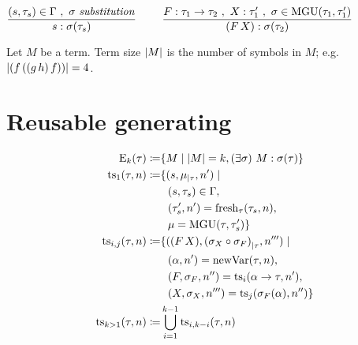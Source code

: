 \documentclass[a4paper,oneside]{memoir}
\begin{document}
~

$\dfrac{(s,\tau_s) \in \Gamma\ ,\ \sigma\ \mathit{substitution}}{s : \sigma(\tau_s)}$
~~~
$\dfrac{F : \tau_1 \rightarrow \tau_2\ ,\ X : \tau^\prime_1\ , \ \sigma \in \operatorname{MGU}(\tau_1,\tau^\prime_1)}{(F\,X) : \sigma(\tau_2)}$


\begin{definition}
Let $M$ be a term. Term size $\lvert M \rvert$ is the number of symbols in $M$; e.g. $\lvert (f\,((g\,h)\,f)) \rvert = 4$. 
\end{definition}

\newcommand{\inhab}[1]{\op{I}(#1)}

\newcommand{\tord}{\preccurlyeq}
\newcommand{\stord}{\prec}
\newcommand{\ordt}{\tord_\tau}
\newcommand{\tek}{\sim}
\newcommand{\ntek}{\nsim}
\newcommand{\ekt}{\tek_\tau}
\newcommand{\nekt}{\ntek_\tau}
\newcommand{\nsucct}{\nsucc_\tau}

\newcommand{\MGI}[1]{\op{MGI}(#1)}
\newcommand{\MGIt}{\MGI{\tau}}
\newcommand{\It}{\op{I}(\tau)}

\newcommand{\ids}{\sigma_{\op{id}}}

\newcommand{\U}[2]{\op{U}(#1,#2)}
\newcommand{\Utt}{\U{\tau}{\tauPr}}
\newcommand{\MGUtt}{\MGU{\tau}{\tauPr}}

\newcommand{\e}[2]{\op{E}_{#1}(#2)}
\newcommand{\restrict}[2]{{#1}_{\mid #2}}
\newcommand{\fresh}[2]{\op{fresh}_{#1}(#2)}
\newcommand{\newVar}[1]{\op{newVar}(#1)}
\newcommand{\Ss}[1]{\op{ss}(#1)}
\newcommand{\TS}[2]{\op{ts}_{#1}(#2)}
\newcommand{\ts}[2]{\op{ts}_{#1}(#2)}
\newcommand{\TSij}[3]{\op{ts}_{#1,#2}(#3)}
\newcommand{\trees}[2]{\op{trees}_{#1}(#2)}
\newcommand{\FX}{\ap{F}{X}}
\newcommand{\sF}{\s_{F}}
\newcommand{\sX}{\s_{X}}
\newcommand{\vars}[1]{\op{vars}(#1)}
\newcommand{\dom}[1]{\op{dom}(#1)}
\newcommand{\IH}{induction hypothesis\xspace}
\newcommand{\discup}{~\mathbin{\dot{\cup}}~}



\section{Reusable generating}

\begin{definition}
\begin{align*}
\e{k}{\tau} \defi& \{ M \mid \abs{M} = k, \E{\s}{ M : \s(\tau) } \} \\
\ts{1}{\tau,n} \defi&  \{ (s,\restrict{\mu}{\tau}, \nPr) \mid \\
 & ~~ (s,\tau_s) \in \Gamma, \\
 & ~~ (\tausPr,\nPr) = \fresh{\tau}{\tau_s, n}, \\
 & ~~ \mu = \mgu{\tau,\tausPr}
\} \\
\ts{i,j}{\tau,n} \defi& \{ (\FX, \restrict{(\sX \circ \sF)}{\tau}, \nPrrr) \mid \\ 
  & ~~ (\alpha, \nPr) = \newVar{\tau,n}, \\
  & ~~ (F,\sF,\nPrr) = \ts{i}{\alpha \ar \tau,\nPr}, \\
  & ~~ (X,\sX,\nPrrr) = \ts{j}{\sF(\alpha), \nPrr} 
\} \\
\ts{k > 1}{\tau,n} \defi& \bigcup\limits_{i=1}^{k-1}  \TSij{i}{k-i}{\tau, n}
\end{align*}
\end{definition}
\end{document}

